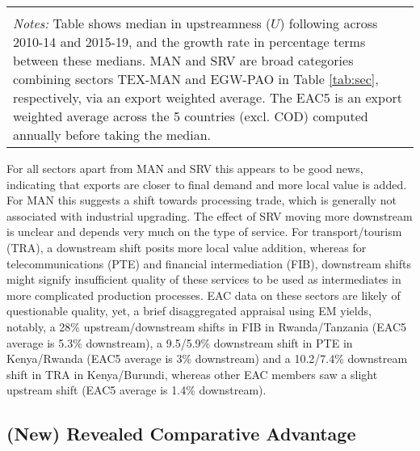 \documentclass[a4paper]{article}
\begin{document}
\begin{table}[ht]
{\begin{tabular}{llrrrrrrrrrrrr}
   \bottomrule \\ [-0.9em]
\multicolumn{14}{l}{\parbox{1.24\textwidth}{\scriptsize
\textit{Notes:} Table shows median in upstreamness ($U$) following \citet{antras2012measuring} across 2010-14 and 2015-19, and the growth rate in percentage terms between these medians. MAN and SRV are broad categories combining sectors TEX-MAN and EGW-PAO in Table \ref{tab:sec}, respectively, via an export weighted average. The EAC5 is an export weighted average across the 5 countries (excl. COD) computed annually before taking the median.  }}
\end{tabular}
}
\end{table}
\FloatBarrier

For all sectors apart from MAN and SRV this appears to be good news, indicating that exports are closer to final demand and more local value is added. For MAN this suggests a shift towards processing trade, which is generally not associated with industrial upgrading. The effect of SRV moving more downstream is unclear and depends very much on the type of service. For transport/tourism (TRA), a downstream shift posits more local value addition, whereas for telecommunications (PTE) and financial intermediation (FIB), downstream shifts might signify insufficient quality of these services to be used as intermediates in more complicated production processes. EAC data on these sectors are likely of questionable quality, yet, a brief disaggregated appraisal using EM yields, notably, a 28\% upstream/downstream shifts in FIB in Rwanda/Tanzania (EAC5 average is 5.3\% downstream), a 9.5/5.9\% downstream shift in PTE in Kenya/Rwanda (EAC5 average is 3\% downstream) and a 10.2/7.4\% downstream shift in TRA in Kenya/Burundi, whereas other EAC members saw a slight upstream shift (EAC5 average is 1.4\% downstream). 


\subsection{(New) Revealed Comparative Advantage}
\end{document}
